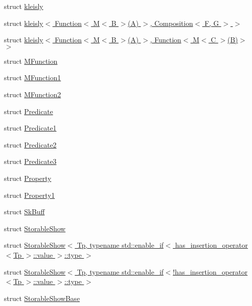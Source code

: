\begin{DoxyCompactItemize}
\item 
struct \hyperlink{structpfq_1_1lang_1_1kleisly}{kleisly}
\item 
struct \hyperlink{structpfq_1_1lang_1_1kleisly_3_01Function_3_01M_3_01B_01_4_07A_08_01_4_00_01Composition_3_01F_00_01G_01_4_01_4}{kleisly$<$ Function$<$ M$<$ B $>$(\+A) $>$, Composition$<$ F, G $>$ $>$}
\item 
struct \hyperlink{structpfq_1_1lang_1_1kleisly_3_01Function_3_01M_3_01B_01_4_07A_08_01_4_00_01Function_3_01M_3_01C_01_4_07B_08_4_01_4}{kleisly$<$ Function$<$ M$<$ B $>$(\+A) $>$, Function$<$ M$<$ C $>$(\+B)$>$ $>$}
\item 
struct \hyperlink{structpfq_1_1lang_1_1MFunction}{M\+Function}
\item 
struct \hyperlink{structpfq_1_1lang_1_1MFunction1}{M\+Function1}
\item 
struct \hyperlink{structpfq_1_1lang_1_1MFunction2}{M\+Function2}
\item 
struct \hyperlink{structpfq_1_1lang_1_1Predicate}{Predicate}
\item 
struct \hyperlink{structpfq_1_1lang_1_1Predicate1}{Predicate1}
\item 
struct \hyperlink{structpfq_1_1lang_1_1Predicate2}{Predicate2}
\item 
struct \hyperlink{structpfq_1_1lang_1_1Predicate3}{Predicate3}
\item 
struct \hyperlink{structpfq_1_1lang_1_1Property}{Property}
\item 
struct \hyperlink{structpfq_1_1lang_1_1Property1}{Property1}
\item 
struct \hyperlink{structpfq_1_1lang_1_1SkBuff}{Sk\+Buff}
\item 
struct \hyperlink{structpfq_1_1lang_1_1StorableShow}{Storable\+Show}
\item 
struct \hyperlink{structpfq_1_1lang_1_1StorableShow_3_01Tp_00_01typename_01std_1_1enable__if_3_01has__insertion__od122cff4f7f007817c88f5b20f967bec}{Storable\+Show$<$ Tp, typename std\+::enable\+\_\+if$<$ has\+\_\+insertion\+\_\+operator$<$\+Tp $>$\+::value $>$\+::type $>$}
\item 
struct \hyperlink{structpfq_1_1lang_1_1StorableShow_3_01Tp_00_01typename_01std_1_1enable__if_3_9has__insertion__op9c58e317fa180887b2f1b929c60377c7}{Storable\+Show$<$ Tp, typename std\+::enable\+\_\+if$<$!has\+\_\+insertion\+\_\+operator$<$\+Tp $>$\+::value $>$\+::type $>$}
\item 
struct \hyperlink{structpfq_1_1lang_1_1StorableShowBase}{Storable\+Show\+Base}
\end{DoxyCompactItemize}
